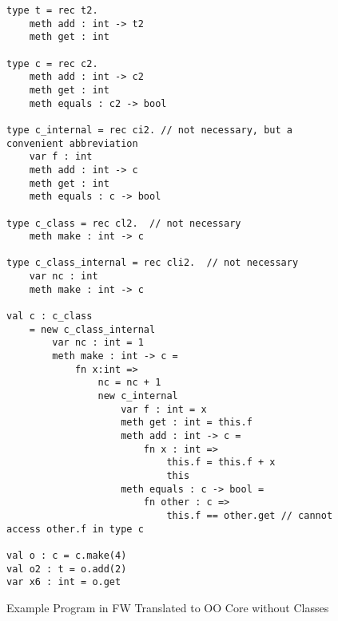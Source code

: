 \begin{figure}
  \centering
  
\begin{lstlisting}
type t = rec t2.
	meth add : int -> t2
	meth get : int

type c = rec c2.
	meth add : int -> c2
	meth get : int
	meth equals : c2 -> bool
		
type c_internal = rec ci2. // not necessary, but a convenient abbreviation
	var f : int
	meth add : int -> c
	meth get : int
	meth equals : c -> bool

type c_class = rec cl2.  // not necessary
	meth make : int -> c
	
type c_class_internal = rec cli2.  // not necessary
	var nc : int
	meth make : int -> c

val c : c_class
	= new c_class_internal
		var nc : int = 1
		meth make : int -> c =
			fn x:int =>
				nc = nc + 1
				new c_internal
					var f : int = x
					meth get : int = this.f
					meth add : int -> c =
						fn x : int =>
							this.f = this.f + x
							this
					meth equals : c -> bool =
						fn other : c =>
							this.f == other.get // cannot access other.f in type c

val o : c = c.make(4)
val o2 : t = o.add(2)
var x6 : int = o.get
\end{lstlisting}

\caption{Example Program in FW Translated to OO Core without Classes}
\label{f-core3-translated-example}

\end{figure}

